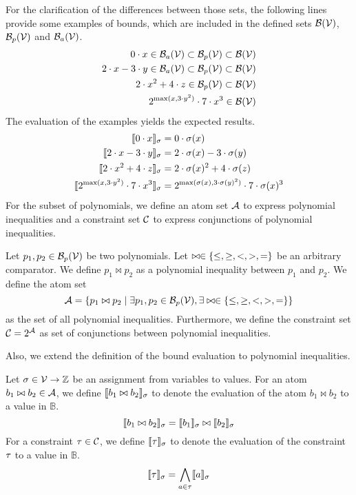 For the clarification of the differences between those sets, the following lines provide some examples of bounds, which are included in the defined sets $\mathcal{B}(\mathcal{V})$, $\mathcal{B}_p(\mathcal{V})$ and $\mathcal{B}_a(\mathcal{V})$.
\begin{align*}
  0 \cdot x \in \mathcal{B}_a(\mathcal{V}) \subset \mathcal{B}_p(\mathcal{V}) \subset \mathcal{B}(\mathcal{V}) \\
  2 \cdot x - 3 \cdot y \in \mathcal{B}_a(\mathcal{V}) \subset \mathcal{B}_p(\mathcal{V}) \subset \mathcal{B}(\mathcal{V}) \\
  2 \cdot x^2 + 4 \cdot z \in \mathcal{B}_p(\mathcal{V}) \subset \mathcal{B}(\mathcal{V}) \\
  2^{\max(x,3 \cdot y^2)} \cdot 7 \cdot x^3 \in \mathcal{B}(\mathcal{V})
\end{align*}
The evaluation of the examples yields the expected results.
\begin{align*}
  \llbracket 0 \cdot x \rrbracket_{\sigma} &= 0 \cdot \sigma(x) \\
  \llbracket 2 \cdot x - 3 \cdot y \rrbracket_{\sigma} &= 2 \cdot \sigma(x) - 3 \cdot \sigma(y) \\
  \llbracket 2 \cdot x^2 + 4 \cdot z \rrbracket_{\sigma} &= 2 \cdot \sigma(x)^2 + 4 \cdot \sigma(z) \\
  \llbracket 2^{\max(x,3 \cdot y^2)} \cdot 7 \cdot x^3 \rrbracket_{\sigma} &= 2^{\max(\sigma(x),3 \cdot \sigma(y)^2)} \cdot 7 \cdot \sigma(x)^3
\end{align*}
For the subset of polynomials, we define an atom set $\mathcal{A}$ to express polynomial inequalities and a constraint set $\mathcal{C}$ to express conjunctions of polynomial inequalities.

\begin{definition}
  Let $p_1, p_2 \in \mathcal{B}_p(\mathcal{V})$ be two polynomials.
  Let $\bowtie \in \lbrace \leq, \geq, <, >, = \rbrace$ be an arbitrary comparator.
  We define $p_1 \bowtie p_2$ as a polynomial inequality between $p_1$ and $p_2$.
  We define the atom set
  \[ \mathcal{A} = \lbrace p_1 \bowtie p_2 \mid \exists p_1, p_2 \in \mathcal{B}_p(\mathcal{V}), \exists \bowtie \in \lbrace \leq, \geq, <, >, = \rbrace \rbrace \]
  as the set of all polynomial inequalities.
  Furthermore, we define the constraint set $\mathcal{C} = 2^{\mathcal{A}}$ as set of conjunctions between polynomial inequalities.
\end{definition}
Also, we extend the definition of the bound evaluation to polynomial inequalities.

\begin{definition}
  Let $\sigma \in \mathcal{V} \rightarrow \mathbb{Z}$ be an assignment from variables to values.
  For an atom $b_1 \bowtie b_2 \in \mathcal{A}$, we define $\llbracket b_1 \bowtie b_2 \rrbracket_{\sigma}$ to denote the evaluation of the atom $b_1 \bowtie b_2$ to a value in $\mathbb{B}$.
  \[ \llbracket b_1 \bowtie b_2 \rrbracket_{\sigma} = \llbracket b_1 \rrbracket_{\sigma} \bowtie \llbracket b_2 \rrbracket_{\sigma} \]
  For a constraint $\tau \in \mathcal{C}$, we define $\llbracket \tau \rrbracket_{\sigma}$ to denote the evaluation of the constraint $\tau$ to a value in $\mathbb{B}$.
  \[ \llbracket \tau \rrbracket_{\sigma} = \bigwedge_{a \in \tau} \llbracket a \rrbracket_{\sigma} \]
\end{definition}
